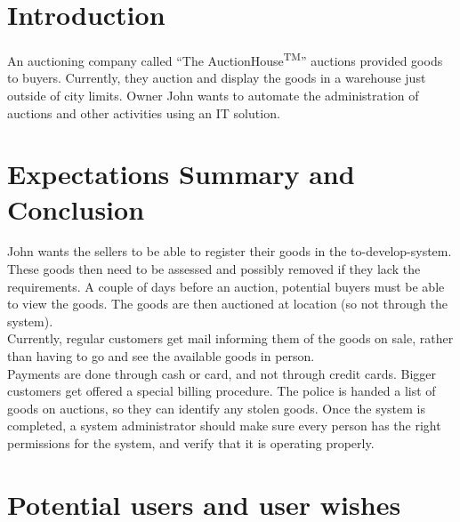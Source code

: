 \section{Introduction}
An auctioning company called ``The AuctionHouse\textsuperscript{TM}'' auctions provided goods to buyers. Currently, they auction and display the goods in a warehouse just outside of city limits. Owner John wants to automate the administration of auctions and other activities using an IT solution.

\section{Expectations Summary and Conclusion}
John wants the sellers to be able to register their goods in the to-develop-system. These goods then need to be assessed and possibly removed if they lack the requirements. A couple of days before an auction, potential buyers must be able to view the goods. The goods are then auctioned at location (so not through the system).\\
Currently, regular customers get mail informing them of the goods on sale, rather than having to go and see the available goods in person.\\
Payments are done through cash or card, and not through credit cards. Bigger customers get offered a special billing procedure.
The police is handed a list of goods on auctions, so they can identify any stolen goods.
Once the system is completed, a system administrator should make sure every person has the right permissions for the system, and verify that it is operating properly.

\section{Potential users and user wishes}
